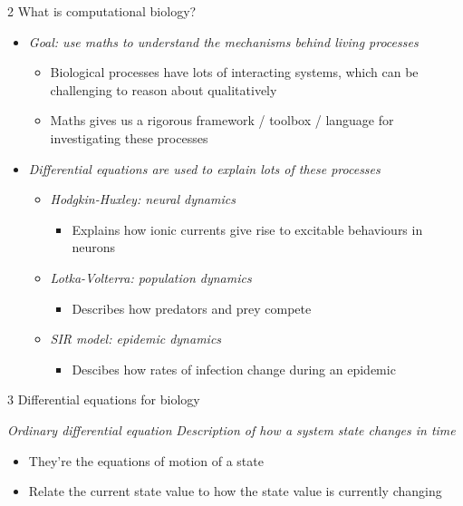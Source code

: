 \documentclass[presentation]{beamer}
\begin{document}
\begin{frame}[label={sec:org4201679}]{2 What is computational biology?}
\begin{itemize}
\item \emph{Goal: use maths to understand the mechanisms behind living processes}
\begin{itemize}
\item Biological processes have lots of interacting systems, which can be challenging to reason about qualitatively
\item Maths gives us a rigorous framework / toolbox / language for investigating these processes
\end{itemize}

\item \emph{Differential equations are used to explain lots of these processes}
\begin{itemize}
\item \emph{Hodgkin-Huxley: neural dynamics}
\begin{itemize}
\item Explains how ionic currents give rise to excitable behaviours in neurons
\end{itemize}

\item \emph{Lotka-Volterra: population dynamics}
\begin{itemize}
\item Describes how predators and prey compete
\end{itemize}

\item \emph{SIR model: epidemic dynamics}
\begin{itemize}
\item Descibes how rates of infection change during an epidemic
\end{itemize}
\end{itemize}
\end{itemize}
\end{frame}

\begin{frame}[label={sec:org09a7cdb}]{3 Differential equations for biology}
\begin{block}{\emph{Ordinary differential equation}}
\emph{Description of how a system state changes in time}
\end{block}

\begin{block}{}
\begin{itemize}
\item They're the equations of motion of a state
\item Relate the current state value to how the state value is currently changing
\end{itemize}
\end{block}
\end{frame}
\end{document}
